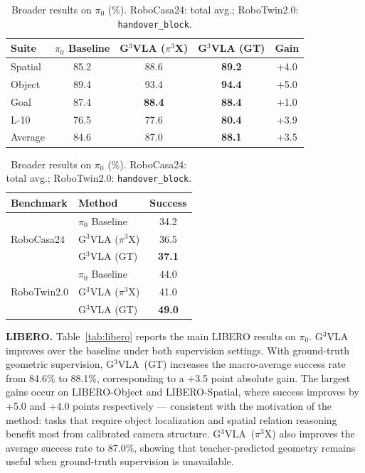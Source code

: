 \documentclass{article}
\begin{document}
\begin{table}[t]
\centering
\begin{minipage}{0.54\textwidth}
    \centering
    \small
    \begin{tabular}{lcccc}
    \toprule
    Suite & $\pi_0$ Baseline & \makecell{G$^3$VLA \\ ($\pi^3$X)} & \makecell{G$^3$VLA \\ (GT)} & Gain \\
    \midrule
    Spatial & 85.2 & 88.6 & \textbf{89.2} & +4.0 \\
    Object  & 89.4 & 93.4 & \textbf{94.4} & +5.0 \\
    Goal    & 87.4 & \textbf{88.4} & \textbf{88.4} & +1.0 \\
    L-10    & 76.5 & 77.6 & \textbf{80.4} & +3.9 \\
    \midrule
    Average & 84.6 & 87.0 & \textbf{88.1} & +3.5 \\
    \bottomrule
    \end{tabular}
    \caption{LIBERO results on $\pi_0$ (\%). Gain denotes absolute improvement of G$^3$VLA~(GT) over baseline.}
    \label{tab:libero}
\end{minipage}
\hfill
\begin{minipage}{0.42\textwidth}
    \centering
    \small
    \begin{tabular}{llc}
    \toprule
    Benchmark & Method & Success \\
    \midrule
    \multirow{3}{*}{RoboCasa24}
        & $\pi_0$ Baseline            & 34.2 \\
        & G$^3$VLA ($\pi^3$X) & 36.5 \\
        & G$^3$VLA (GT)       & \textbf{37.1} \\
    \midrule
    \multirow{3}{*}{RoboTwin2.0}
        & $\pi_0$ Baseline            & 44.0 \\
        & G$^3$VLA ($\pi^3$X) & 41.0 \\
        & G$^3$VLA (GT)       & \textbf{49.0} \\
    \bottomrule
    \end{tabular}
    \caption{Broader results on $\pi_0$ (\%). RoboCasa24: total avg.; RoboTwin2.0: \texttt{handover\_block}.}
    \label{tab:broader}
\end{minipage}
\vspace{-1cm}
\end{table}

\textbf{LIBERO.} Table~\ref{tab:libero} reports the main LIBERO results on $\pi_0$.
G$^3$VLA improves over the baseline under both supervision settings. With
ground-truth geometric supervision, G$^3$VLA~(GT) increases the macro-average
success rate from 84.6\% to 88.1\%, corresponding to a +3.5 point absolute gain.
The largest gains occur on LIBERO-Object and LIBERO-Spatial, where success
improves by +5.0 and +4.0 points respectively --- consistent with the motivation
of the method: tasks that require object localization and spatial relation reasoning
benefit most from calibrated camera structure. G$^3$VLA~($\pi^3$X) also improves
the average success rate to 87.0\%, showing that teacher-predicted geometry
remains useful when ground-truth supervision is unavailable.
\end{document}
